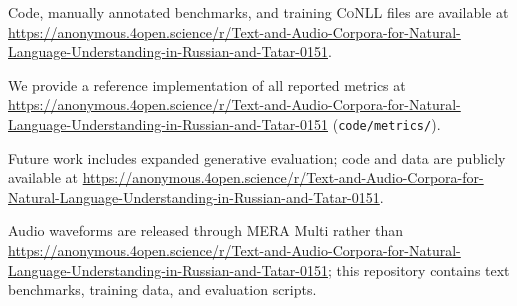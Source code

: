 \newcommand{\anonrepo}{\url{https://anonymous.4open.science/r/Text-and-Audio-Corpora-for-Natural-Language-Understanding-in-Russian-and-Tatar-0151}}

Code, manually annotated benchmarks, and training \textsc{CoNLL} files are available at \anonrepo{}.

We provide a reference implementation of all reported metrics at \anonrepo{} (\texttt{code/metrics/}).

Future work includes expanded generative evaluation; code and data are publicly available at \anonrepo{}.

Audio waveforms are released through MERA Multi rather than \anonrepo{}; this repository contains text benchmarks, training data, and evaluation scripts.


